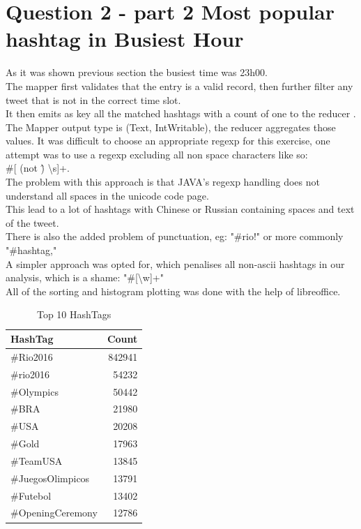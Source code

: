\documentclass[12pt]{article}
\begin{document}
\section{Question 2 - part 2 Most popular hashtag in Busiest Hour}

As it was shown previous section the busiest time was 23h00. \\
The mapper first validates that the entry is a valid record, then
further filter any tweet that is not in the correct time slot. \\
It then emits as key all the matched hashtags with a count of one to the reducer . \\
The Mapper output type is (Text, IntWritable), the reducer aggregates those values.
It was difficult to choose an appropriate regexp for this exercise, one attempt was to
use a regexp excluding all non space characters like so: \\
\#[ (not \^)  \textbackslash s]+. \\
The problem with this approach is that JAVA's regexp handling does not understand all spaces in the unicode code page. \\
This lead to a lot of hashtags with Chinese or Russian containing spaces and text of the tweet. \\ There is also the added problem of punctuation, eg: "\#rio!" or more commonly "\#hashtag," \\
A simpler approach was opted for, which penalises all non-ascii hashtags in our analysis, which is a shame: "\#[\textbackslash w]+" \\
All of the sorting and histogram plotting was done with the help of libreoffice. \\

\begin{table}[ht]
\centering
\caption{Top 10 HashTags}
\label{table:top_hashtags}
\begin{tabular}{ l r }
\hline
HashTag & Count \\
\hline
\#Rio2016 &	842941 \\
\#rio2016 &	54232 \\
\#Olympics &	50442 \\
\#BRA &	21980 \\
\#USA &	20208 \\
\#Gold &	17963 \\
\#TeamUSA &	13845 \\
\#JuegosOlimpicos &	13791 \\
\#Futebol &	13402 \\
\#OpeningCeremony &	12786 \\
\end{tabular}
\end{table}
\end{document}
